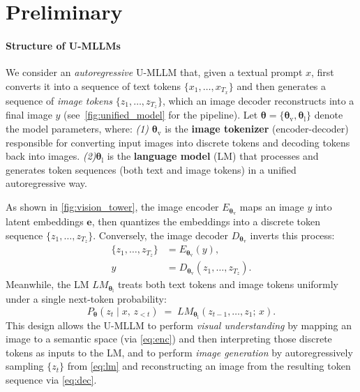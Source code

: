 \vspace{-2em}
\section{Preliminary}
\label{sec:pre}

\paragraph{Structure of U-MLLMs}
We consider an \emph{autoregressive} U-MLLM that, given a textual prompt $x$, first converts it into a sequence of text tokens $\{x_1, \dots, x_{T_x}\}$ and then generates a sequence of \emph{image tokens} $\{z_1,\dots,z_{T_z}\}$, which an image decoder reconstructs into a final image $y$ (see~\autoref{fig:unified_model} for the pipeline). Let $\boldsymbol{\theta} = \{\boldsymbol{\theta}_{\mathrm{v}}, \boldsymbol{\theta}_{\mathrm{l}}\}$ denote the model parameters, where: \emph{(1)} $\boldsymbol{\theta}_{\mathrm{v}}$ is the \textbf{image tokenizer} (encoder-decoder) responsible for converting input images into discrete tokens and decoding tokens back into images. \emph{(2)}$ \boldsymbol{\theta}_{\mathrm{l}}$ is the \textbf{language model} (LM) that processes and generates token sequences (both text and image tokens) in a unified autoregressive way.

As shown in \autoref{fig:vision_tower},  the image encoder $E_{\boldsymbol{\theta}_{\mathrm{v}}}$ maps an image $y$ into latent embeddings $\textbf{e}$, then quantizes the embeddings into a discrete token sequence $\{z_1,\dots,z_{T_z}\}$. Conversely, the image decoder $D_{\boldsymbol{\theta}_{\mathrm{v}}}$ inverts this process:
\begin{align}
    \{z_1,\dots,z_{T_z}\} &= E_{\boldsymbol{\theta}_{\mathrm{v}}}(y), 
    \label{eq:enc}\\
    y &= D_{\boldsymbol{\theta}_{\mathrm{v}}}(z_1,\dots,z_{T_z}).
    \label{eq:dec}
\end{align}
Meanwhile, the LM $LM_{\boldsymbol{\theta}_{\mathrm{l}}}$ treats both text tokens and image tokens uniformly under a single next-token probability:
\begin{equation}
    P_{\boldsymbol{\theta}}(z_t \mid x,\, z_{<t})
    \;=\;
    LM_{\boldsymbol{\theta}_{\mathrm{l}}}(z_{t-1},\dots,z_1;\, x).
    \label{eq:lm}
\end{equation}
This design allows the U-MLLM to perform \emph{visual understanding} by mapping an image to a semantic space (via \cref{eq:enc}) and then interpreting those discrete tokens as inputs to the LM, and to perform \emph{image generation} by autoregressively sampling $\{z_t\}$ from \cref{eq:lm} and reconstructing an image from the resulting token sequence via \cref{eq:dec}.
\vspace{-1em}
